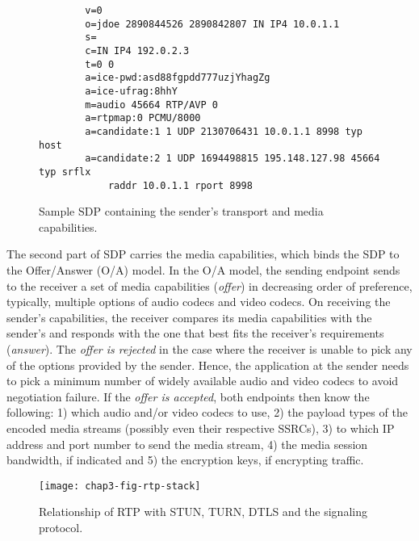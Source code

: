 
\begin{figure}[!h]
{\small
\begin{verbatim}
        v=0
        o=jdoe 2890844526 2890842807 IN IP4 10.0.1.1
        s=
        c=IN IP4 192.0.2.3
        t=0 0
        a=ice-pwd:asd88fgpdd777uzjYhagZg
        a=ice-ufrag:8hhY
        m=audio 45664 RTP/AVP 0
        a=rtpmap:0 PCMU/8000
        a=candidate:1 1 UDP 2130706431 10.0.1.1 8998 typ host
        a=candidate:2 1 UDP 1694498815 195.148.127.98 45664 typ srflx 
            raddr 10.0.1.1 rport 8998
\end{verbatim}
}
\caption{Sample SDP containing the sender's transport and media capabilities.}
\label{fig:3:sdp}
\end{figure}

The second part of SDP carries the media capabilities, which binds the SDP to
the Offer/Answer (O/A) model. In the O/A model, the sending endpoint sends to
the receiver a set of media capabilities (\emph{offer}) in decreasing order of
preference, typically, multiple options of audio codecs and video codecs. On
receiving the sender's capabilities, the receiver compares its media
capabilities with the sender's and responds with the one that best fits the
receiver's requirements (\emph{answer}). The \emph{offer is rejected} in the
case where the receiver is unable to pick any of the options provided by the
sender. Hence, the application at the sender needs to pick a minimum number of
widely available audio and video codecs to avoid negotiation failure. If the
\emph{offer is accepted}, both endpoints then know the following: 1) which
audio and/or video codecs to use, 2) the payload types of the encoded media
streams (possibly even their respective SSRCs), 3) to which IP address and
port number to send the media stream, 4) the media session bandwidth, if
indicated and 5) the encryption keys, if encrypting traffic.

\begin{figure}
\texttt{[image: chap3-fig-rtp-stack]}
\caption{Relationship of RTP with STUN, TURN, DTLS and the signaling protocol.}
\label{fig:3:rtp-stack}
\end{figure}

